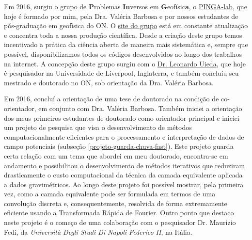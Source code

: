 Em 2016, surgiu o grupo de \textbf{P}roblemas \textbf{In}versos 
em \textbf{G}eofísic\textbf{a}, o \href{https://www.pinga-lab.org/}{PINGA-lab}, 
que hoje é formado por mim, pela Dra. Valéria Barbosa e por nossos estudantes de 
pós-graduação em geofísica do ON. O \href{https://www.pinga-lab.org/}{site do grupo} 
está em constante atualização e concentra toda a nossa produção científica. 
Desde a criação deste grupo temos incentivado a prática da ciência aberta de maneira 
mais sistemática e, sempre que possível, disponibilizamos todos os códigos desenvolvidos 
ao longo dos trabalhos na internet. A concepção deste grupo surgiu com o 
\href{https://www.leouieda.com/}{Dr. Leonardo Uieda}, que hoje é pesquisador na 
Universidade de Liverpool, Inglaterra, e também concluiu seu mestrado e doutorado no 
ON, sob orientação da Dra. Valéria Barbosa.

Em 2016, concluí a orientação de uma tese de doutorado na condição de co-orientador, em 
conjunto com Dra. Valéria Barbosa. Também iniciei a orientação 
dos meus primeiros estudantes de doutorado como orientador principal e iniciei um 
projeto de pesquisa que visa o desenvolvimento de métodos computacionalmente eficientes 
para o processamento e interpretação de dados de campo potenciais (subseção 
\ref{projeto-guarda-chuva-fast}). Este projeto guarda certa relação com um tema que 
abordei em meu doutorado, encontra-se em andamento e possibilitou o 
desenvolvimento de métodos iterativos que reduziram drasticamente o custo computacional
da técnica da camada equivalente aplicada a dados gravimétricos. 
Ao longo deste projeto foi possível mostrar, pela primeira vez, 
como a camada equivalente pode ser formulada em termos de uma convolução discreta e,
consequentemente, resolvida de forma extremamente eficiente usando a Transformada 
Rápida de Fourier. 
Outro ponto que destaco neste projeto é o começo de uma colaboração com o pesquisador 
Dr. Maurizio Fedi, da \textit{Università Degli Studi Di Napoli Federico II}, na Itália.

